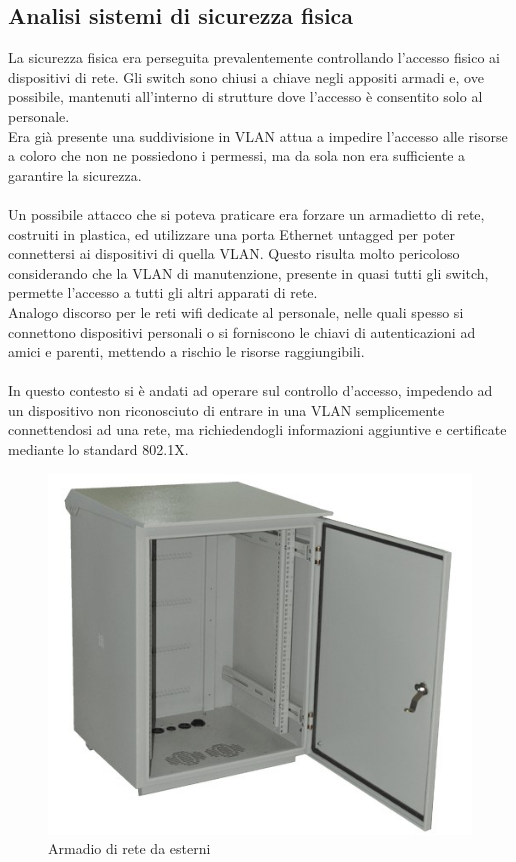 \documentclass[Realizzazione.tex]{subfiles}
\begin{document}
\subsection{Analisi sistemi di sicurezza fisica}
La sicurezza fisica era perseguita prevalentemente controllando l'accesso fisico ai dispositivi di rete. Gli switch sono chiusi a chiave negli appositi armadi e, ove possibile, mantenuti all'interno di strutture dove l'accesso è consentito solo al personale. \\
Era già presente una suddivisione in VLAN attua a impedire l'accesso alle risorse a coloro che non ne possiedono i permessi, ma da sola non era sufficiente a garantire la sicurezza. \\\\
Un possibile attacco che si poteva praticare era forzare un armadietto di rete, costruiti in plastica, ed utilizzare una porta Ethernet untagged per poter connettersi ai dispositivi di quella VLAN. Questo risulta molto pericoloso considerando che la VLAN di manutenzione, presente in quasi tutti gli switch, permette l'accesso a tutti gli altri apparati di rete. \\
Analogo discorso per le reti wifi dedicate al personale, nelle quali spesso si connettono dispositivi personali o si forniscono le chiavi di autenticazioni ad amici e parenti, mettendo a rischio le risorse raggiungibili. \\\\
In questo contesto si è andati ad operare sul controllo d'accesso, impedendo ad un dispositivo non riconosciuto di entrare in una VLAN semplicemente connettendosi ad una rete, ma richiedendogli informazioni aggiuntive e certificate mediante lo standard 802.1X.

\begin{figure}[H]
	\centering
	\includegraphics[width=0.5\linewidth]{"images/Outdoor rack"}
	\caption{Armadio di rete da esterni}
	\label{fig:Armadio di rete da esterni}
\end{figure}
\end{document}
